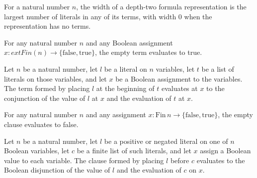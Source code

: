 \begin{definition}
\label{Depth2.width}
\leanok
{}
For a natural number $n$, the width of a depth-two formula representation is the largest
number of literals in any of its terms, with width $0$ when the representation has no
terms.
\end{definition}

\begin{theorem}
\label{Term.eval_nil}
\leanok
{}
For any natural number $n$ and any Boolean assignment $x : 	ext{Fin}(n) \to
\{\mathrm{false},\mathrm{true}\}$, the empty term evaluates to true.
\end{theorem}

\begin{theorem}
\label{Term.eval_cons}
\leanok
{}
Let $n$ be a natural number, let $l$ be a literal on $n$ variables, let $t$ be a list of
literals on those variables, and let $x$ be a Boolean assignment to the variables. The
term formed by placing $l$ at the beginning of $t$ evaluates at $x$ to the conjunction
of the value of $l$ at $x$ and the evaluation of $t$ at $x$.
\end{theorem}

\begin{theorem}
\label{Clause.eval_nil}
\leanok
{}
For any natural number $n$ and any assignment $x : \mathrm{Fin}\,n \to
\{\mathrm{false},\mathrm{true}\}$, the empty clause evaluates to false.
\end{theorem}

\begin{theorem}
\label{Clause.eval_cons}
\leanok
{}
Let $n$ be a natural number, let $l$ be a positive or negated literal on one of $n$
Boolean variables, let $c$ be a finite list of such literals, and let $x$ assign a
Boolean value to each variable. The clause formed by placing $l$ before $c$ evaluates to
the Boolean disjunction of the value of $l$ and the evaluation of $c$ on $x$.
\end{theorem}

